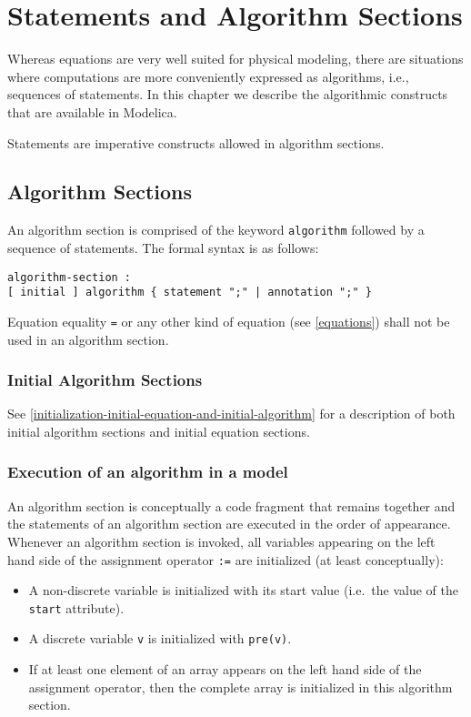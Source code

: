 \chapter{Statements and Algorithm Sections}\label{statements-and-algorithm-sections}

Whereas equations are very well suited for physical modeling, there are
situations where computations are more conveniently expressed as
algorithms, i.e., sequences of statements. In this chapter we describe
the algorithmic constructs that are available in Modelica.

Statements are imperative constructs allowed in algorithm sections.

\section{Algorithm Sections}\label{algorithm-sections}

An algorithm section is comprised of the keyword \lstinline!algorithm! followed by a
sequence of statements. The formal syntax is as follows:
\begin{lstlisting}[language=grammar]
algorithm-section :
[ initial ] algorithm { statement ";" | annotation ";" }
\end{lstlisting}

Equation equality \lstinline!=! or any other kind of equation (see \cref{equations}) shall
not be used in an algorithm section.

\subsection{Initial Algorithm Sections}\label{initial-algorithm-sections}

See \cref{initialization-initial-equation-and-initial-algorithm} for a description of both initial algorithm sections and
initial equation sections.

\subsection{Execution of an algorithm in a model}\label{execution-of-an-algorithm-in-a-model}

An algorithm section is conceptually a code fragment that remains
together and the statements of an algorithm section are executed in the
order of appearance. Whenever an algorithm section is invoked, all
variables appearing on the left hand side of the assignment operator
\lstinline!:=! are initialized (at least conceptually):
\begin{itemize}
\item
  A non-discrete variable is initialized with its start value (i.e.\ the
  value of the \lstinline!start! attribute).
\item
  A discrete variable \lstinline!v! is initialized with \lstinline!pre(v)!.
\item
  If at least one element of an array appears on the left hand side of
  the assignment operator, then the complete array is initialized in
  this algorithm section.
\end{itemize}

